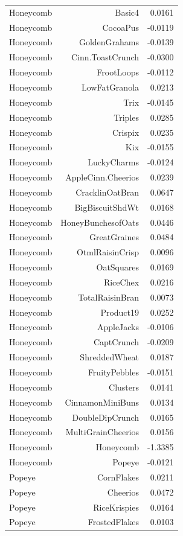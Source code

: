 \begin{longtable}{@{}lrr@{}}
Honeycomb & Basic4 & 0.0161 \\
Honeycomb & CocoaPus & -0.0119 \\
Honeycomb & GoldenGrahams & -0.0139 \\
Honeycomb & Cinn.ToastCrunch & -0.0300 \\
Honeycomb & FrootLoops & -0.0112 \\
Honeycomb & LowFatGranola & 0.0213 \\
Honeycomb & Trix & -0.0145 \\
Honeycomb & Triples & 0.0285 \\
Honeycomb & Crispix & 0.0235 \\
Honeycomb & Kix & -0.0155 \\
Honeycomb & LuckyCharms & -0.0124 \\
Honeycomb & AppleCinn.Cheerios & 0.0239 \\
Honeycomb & CracklinOatBran & 0.0647 \\
Honeycomb & BigBiscuitShdWt & 0.0168 \\
Honeycomb & HoneyBunchesofOats & 0.0446 \\
Honeycomb & GreatGraines & 0.0484 \\
Honeycomb & OtmlRaisinCrisp & 0.0096 \\
Honeycomb & OatSquares & 0.0169 \\
Honeycomb & RiceChex & 0.0216 \\
Honeycomb & TotalRaisinBran & 0.0073 \\
Honeycomb & Product19 & 0.0252 \\
Honeycomb & AppleJacks & -0.0106 \\
Honeycomb & CaptCrunch & -0.0209 \\
Honeycomb & ShreddedWheat & 0.0187 \\
Honeycomb & FruityPebbles & -0.0151 \\
Honeycomb & Clusters & 0.0141 \\
Honeycomb & CinnamonMiniBuns & 0.0134 \\
Honeycomb & DoubleDipCrunch & 0.0165 \\
Honeycomb & MultiGrainCheerios & 0.0156 \\
Honeycomb & Honeycomb & -1.3385 \\
Honeycomb & Popeye & -0.0121 \\
Popeye & CornFlakes & 0.0211 \\
Popeye & Cheerios & 0.0472 \\
Popeye & RiceKrispies & 0.0164 \\
Popeye & FrostedFlakes & 0.0103 \\

\end{longtable}
